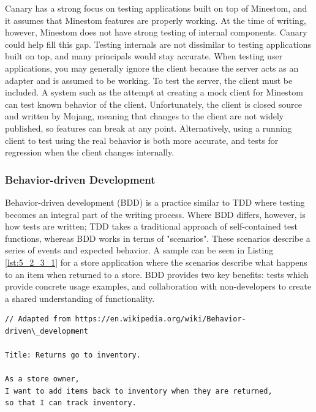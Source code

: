 \documentclass[12pt]{article}
\begin{document}
\begin{onehalfspacing}
Canary has a strong focus on testing applications built on top of
Minestom, and it assumes that Minestom features are properly working. At
the time of writing, however, Minestom does not have strong testing of
internal components. Canary could help fill this gap. Testing internals
are not dissimilar to testing applications built on top, and many
principals would stay accurate. When testing user applications, you may
generally ignore the client because the server acts as an adapter and is
assumed to be working. To test the server, the client must be included.
A system such as the attempt at creating a mock client for Minestom can
test known behavior of the client. Unfortunately, the client is closed
source and written by Mojang, meaning that changes to the client are not
widely published, so features can break at any point. Alternatively,
using a running client to test using the real behavior is both more
accurate, and tests for regression when the client changes internally.

\subsubsection{Behavior-driven Development}

Behavior-driven development (BDD) is a practice similar to TDD where
testing becomes an integral part of the writing process. Where BDD
differs, however, is how tests are written; TDD takes a traditional
approach of self-contained test functions, whereas BDD works in terms of
"scenarios". These scenarios describe a series of events and expected
behavior. A sample can be seen in Listing \ref{lst:5_2_3_1} for a store
application where the scenarios describe what happens to an item when
returned to a store. BDD provides two key benefits: tests which provide
concrete usage examples, and collaboration with non-developers to create
a shared understanding of functionality.



\begin{listing}[H]
\begin{verbatim}
// Adapted from https://en.wikipedia.org/wiki/Behavior-driven\_development

Title: Returns go to inventory.

As a store owner,
I want to add items back to inventory when they are returned,
so that I can track inventory.


\end{verbatim}
\end{listing}
\end{onehalfspacing}
\end{document}
